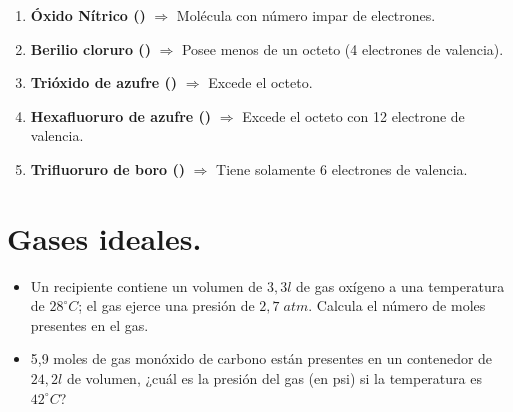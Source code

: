 \documentclass[a4paper,12pt]{article} %
\begin{document}
\begin{enumerate}
    \item \textbf{Óxido Nítrico ()} \(\Rightarrow\) Molécula con número impar de electrones.
    

    \item \textbf{Berilio cloruro ()} \(\Rightarrow\) Posee menos de un octeto (4 electrones de valencia).
    

    \item \textbf{Trióxido de azufre ()} \(\Rightarrow\) Excede el octeto.
    


    \item \textbf{Hexafluoruro de azufre ()} \(\Rightarrow\) Excede el octeto con 12 electrone de valencia.
    


    \item \textbf{Trifluoruro de boro ()} \(\Rightarrow\) Tiene solamente 6 electrones de valencia.
    
\end{enumerate}

\vspace{\baselineskip}


\section{Gases ideales.}

\begin{justify}
    \begin{itemize}
        \item Un recipiente contiene un volumen de \(3,3 l\) de gas oxígeno a una temperatura de \(28^\circ C\); el gas ejerce una presión de \( 2,7 \; atm\). Calcula el número de moles presentes en el gas.
        \item 5,9 moles de gas monóxido de carbono están presentes en un contenedor de \(24,2 l\) de volumen, ¿cuál es la presión del gas (en psi) si la temperatura es \(42^\circ C\)? 
    \end{itemize}
\end{justify}

\vspace{\baselineskip}
\end{document}
